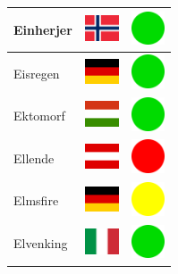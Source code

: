 \documentclass[12pt, a4paper, twoside]{report}
\begin{document}
\begin{center}
\begin{longtable}{|p{5cm}|p{2cm}|p{2cm}|}
			Einherjer & \includegraphics[width=1cm]{4x3/no} & \includegraphics[width=1cm]{likes/y} \\ \hline
			Eisregen & \includegraphics[width=1cm]{4x3/de} & \includegraphics[width=1cm]{likes/y} \\ \hline
			Ektomorf & \includegraphics[width=1cm]{4x3/hu} & \includegraphics[width=1cm]{likes/y} \\ \hline
			Ellende & \includegraphics[width=1cm]{4x3/at} & \includegraphics[width=1cm]{likes/n} \\ \hline
			Elmsfire & \includegraphics[width=1cm]{4x3/de} & \includegraphics[width=1cm]{likes/m} \\ \hline
			Elvenking & \includegraphics[width=1cm]{4x3/it} & \includegraphics[width=1cm]{likes/y} \\ \hline

\end{longtable}
\end{center}
\end{document}
